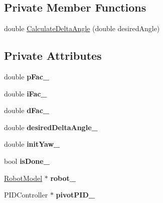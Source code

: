 \subsection*{Private Member Functions}
\begin{DoxyCompactItemize}
\item 
double \hyperlink{class_pivot_command_a56f0c011b2a744f1ed0a2b5cb301cdb2}{Calculate\+Delta\+Angle} (double desired\+Angle)
\end{DoxyCompactItemize}
\subsection*{Private Attributes}
\begin{DoxyCompactItemize}
\item 
\mbox{\label{class_pivot_command_af19ee15f8b4d195bf02fbc697eba1641}} 
double {\bfseries p\+Fac\+\_\+}
\item 
\mbox{\label{class_pivot_command_a8a4c07edea472ab21522cca70fe531a2}} 
double {\bfseries i\+Fac\+\_\+}
\item 
\mbox{\label{class_pivot_command_a076fe76ca613db3f914408607e91d7bc}} 
double {\bfseries d\+Fac\+\_\+}
\item 
\mbox{\label{class_pivot_command_aaf3bb529c25ee4d2ed040fdacb794d1f}} 
double {\bfseries desired\+Delta\+Angle\+\_\+}
\item 
\mbox{\label{class_pivot_command_aa0fc36f13532c492f5e86b4d5d0be93e}} 
double {\bfseries init\+Yaw\+\_\+}
\item 
\mbox{\label{class_pivot_command_a40b669643047869696913de119de0347}} 
bool {\bfseries is\+Done\+\_\+}
\item 
\mbox{\label{class_pivot_command_ad1fd030762a6b95d8c8ccad7375c2dcb}} 
\hyperlink{class_robot_model}{Robot\+Model} $\ast$ {\bfseries robot\+\_\+}
\item 
\mbox{\label{class_pivot_command_ae2fcdfa0e3be71c8b06a42440dbe3003}} 
P\+I\+D\+Controller $\ast$ {\bfseries pivot\+P\+I\+D\+\_\+}
\item 

\end{DoxyCompactItemize}
